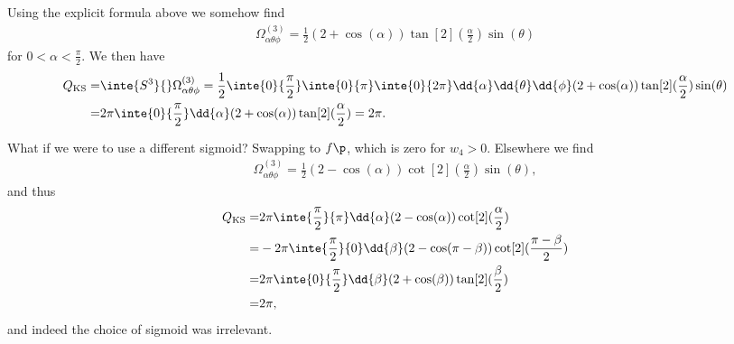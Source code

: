 Using the explicit formula above we somehow find
\begin{align*}
	\Omega^{(3)}_{\alpha\theta\phi} = \frac{1}{2}(2 + \cos(\alpha))\tan[2](\frac{\alpha}{2})\sin(\theta)
\end{align*}
for $0 < \alpha < \frac{\pi}{2}$. We then have
\begin{align*}
	Q_{\text{KS}} =& \inte{S^{3}}{}\Omega^{(3)}_{\alpha\theta\phi} = \frac{1}{2}\inte{0}{\frac{\pi}{2}}\inte{0}{\pi}\inte{0}{2\pi}\dd{\alpha}\dd{\theta}\dd{\phi}(2 + \cos(\alpha))\tan[2](\frac{\alpha}{2})\sin(\theta) \\
	              =& 2\pi\inte{0}{\frac{\pi}{2}}\dd{\alpha}(2 + \cos(\alpha))\tan[2](\frac{\alpha}{2}) = 2\pi.
\end{align*}

What if we were to use a different sigmoid? Swapping to $f\p$, which is zero for $w_{4} > 0$. Elsewhere we find
\begin{align*}
	\Omega^{(3)}_{\alpha\theta\phi} = \frac{1}{2}(2 - \cos(\alpha))\cot[2](\frac{\alpha}{2})\sin(\theta),
\end{align*}
and thus
\begin{align*}
	Q_{\text{KS}} =& 2\pi\inte{\frac{\pi}{2}}{\pi}\dd{\alpha}(2 - \cos(\alpha))\cot[2](\frac{\alpha}{2}) \\
	              =& -2\pi\inte{\frac{\pi}{2}}{0}\dd{\beta}(2 - \cos(\pi - \beta))\cot[2](\frac{\pi - \beta}{2}) \\
	              =& 2\pi\inte{0}{\frac{\pi}{2}}\dd{\beta}(2 + \cos(\beta))\tan[2](\frac{\beta}{2}) \\
	              =& 2\pi,
\end{align*}
and indeed the choice of sigmoid was irrelevant.